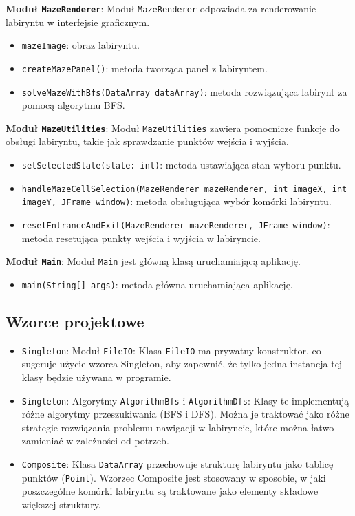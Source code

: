 \documentclass{article}
\begin{document}
\textbf{Moduł \texttt{MazeRenderer}}: Moduł \texttt{MazeRenderer} odpowiada za renderowanie labiryntu w interfejsie graficznym.

\begin{itemize}
  \item \texttt{mazeImage}: obraz labiryntu.
  \item \texttt{createMazePanel()}: metoda tworząca panel z labiryntem.
  \item \texttt{solveMazeWithBfs(DataArray dataArray)}: metoda rozwiązująca labirynt za pomocą algorytmu BFS.
\end{itemize}

\textbf{Moduł \texttt{MazeUtilities}}: Moduł \texttt{MazeUtilities} zawiera pomocnicze funkcje do obsługi labiryntu, takie jak sprawdzanie punktów wejścia i wyjścia.

\begin{itemize}
  \item \texttt{setSelectedState(state: int)}: metoda ustawiająca stan wyboru punktu.
  \item \texttt{handleMazeCellSelection(MazeRenderer mazeRenderer, int imageX, int imageY, JFrame window)}: metoda obsługująca wybór komórki labiryntu.
  \item \texttt{resetEntranceAndExit(MazeRenderer mazeRenderer, JFrame window)}: metoda resetująca punkty wejścia i wyjścia w labiryncie.
\end{itemize}

\textbf{Moduł \texttt{Main}}: Moduł \texttt{Main} jest główną klasą uruchamiającą aplikację.

\begin{itemize}
  \item \texttt{main(String[] args)}: metoda główna uruchamiająca aplikację.
\end{itemize}

\subsection{Wzorce projektowe}

\begin{itemize}
  \item \texttt{Singleton}: Moduł \texttt{FileIO}: Klasa \texttt{FileIO} ma prywatny konstruktor, co sugeruje użycie wzorca Singleton, aby zapewnić, że tylko jedna instancja tej klasy będzie używana w programie.
  
  \item \texttt{Singleton}: Algorytmy \texttt{AlgorithmBfs} i \texttt{AlgorithmDfs}: Klasy te implementują różne algorytmy przeszukiwania (BFS i DFS). Można je traktować jako różne strategie rozwiązania problemu nawigacji w labiryncie, które można łatwo zamieniać w zależności od potrzeb.
  
  \item \texttt{Composite}: Klasa \texttt{DataArray} przechowuje strukturę labiryntu jako tablicę punktów (\texttt{Point}). Wzorzec Composite jest stosowany w sposobie, w jaki poszczególne komórki labiryntu są traktowane jako elementy składowe większej struktury.
\end{itemize}
\end{document}
